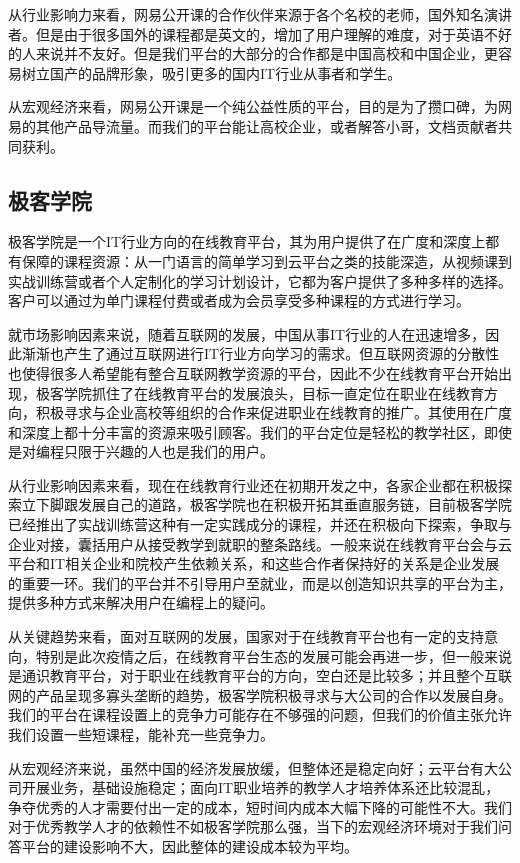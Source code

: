 \documentclass[a4paper]{ctexart}
\begin{document}
从行业影响力来看，网易公开课的合作伙伴来源于各个名校的老师，国外知名演讲者。但是由于很多国外的课程都是英文的，增加了用户理解的难度，对于英语不好的人来说并不友好。但是我们平台的大部分的合作都是中国高校和中国企业，更容易树立国产的品牌形象，吸引更多的国内IT行业从事者和学生。

从宏观经济来看，网易公开课是一个纯公益性质的平台，目的是为了攒口碑，为网易的其他产品导流量。而我们的平台能让高校企业，或者解答小哥，文档贡献者共同获利。


\subsection{极客学院}
极客学院是一个IT行业方向的在线教育平台，其为用户提供了在广度和深度上都有保障的课程资源：从一门语言的简单学习到云平台之类的技能深造，从视频课到实战训练营或者个人定制化的学习计划设计，它都为客户提供了多种多样的选择。客户可以通过为单门课程付费或者成为会员享受多种课程的方式进行学习。

就市场影响因素来说，随着互联网的发展，中国从事IT行业的人在迅速增多，因此渐渐也产生了通过互联网进行IT行业方向学习的需求。但互联网资源的分散性也使得很多人希望能有整合互联网教学资源的平台，因此不少在线教育平台开始出现，极客学院抓住了在线教育平台的发展浪头，目标一直定位在职业在线教育方向，积极寻求与企业高校等组织的合作来促进职业在线教育的推广。其使用在广度和深度上都十分丰富的资源来吸引顾客。我们的平台定位是轻松的教学社区，即使是对编程只限于兴趣的人也是我们的用户。

从行业影响因素来看，现在在线教育行业还在初期开发之中，各家企业都在积极探索立下脚跟发展自己的道路，极客学院也在积极开拓其垂直服务链，目前极客学院已经推出了实战训练营这种有一定实践成分的课程，并还在积极向下探索，争取与企业对接，囊括用户从接受教学到就职的整条路线。一般来说在线教育平台会与云平台和IT相关企业和院校产生依赖关系，和这些合作者保持好的关系是企业发展的重要一环。我们的平台并不引导用户至就业，而是以创造知识共享的平台为主，提供多种方式来解决用户在编程上的疑问。

从关键趋势来看，面对互联网的发展，国家对于在线教育平台也有一定的支持意向，特别是此次疫情之后，在线教育平台生态的发展可能会再进一步，但一般来说是通识教育平台，对于职业在线教育平台的方向，空白还是比较多；并且整个互联网的产品呈现多寡头垄断的趋势，极客学院积极寻求与大公司的合作以发展自身。我们的平台在课程设置上的竞争力可能存在不够强的问题，但我们的价值主张允许我们设置一些短课程，能补充一些竞争力。

从宏观经济来说，虽然中国的经济发展放缓，但整体还是稳定向好；云平台有大公司开展业务，基础设施稳定；面向IT职业培养的教学人才培养体系还比较混乱，争夺优秀的人才需要付出一定的成本，短时间内成本大幅下降的可能性不大。我们对于优秀教学人才的依赖性不如极客学院那么强，当下的宏观经济环境对于我们问答平台的建设影响不大，因此整体的建设成本较为平均。
\end{document}
